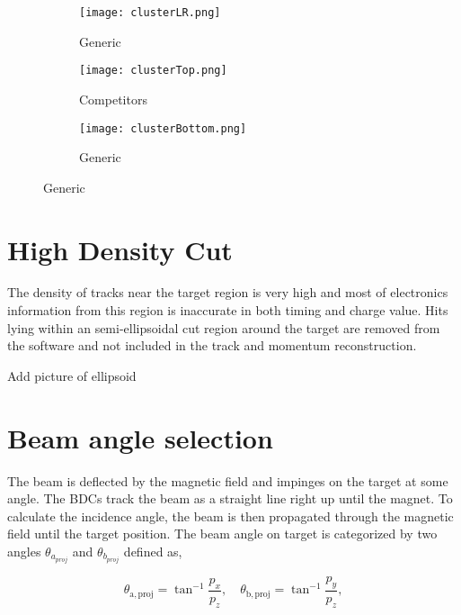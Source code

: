 \begin{figure}[!htb]
    \centering
    \begin{subfigure}[t]{0.45\textwidth}
        \centering
        \texttt{[image: clusterLR.png]} 
        \caption{Generic} \label{fig:clusterLR}
    \end{subfigure}
    \hfill
    \begin{subfigure}[t]{0.45\textwidth}
        \centering
        \texttt{[image: clusterTop.png]} 
        \caption{Competitors} \label{fig:clusterTop}
    \end{subfigure}
    
    \begin{subfigure}[t]{0.45\textwidth}
        \centering
        \texttt{[image: clusterBottom.png]} 
        \caption{Generic} \label{fig:clusterBottom}
    \end{subfigure}
   
\label{fig:edge}
\end{figure}

\section{High Density Cut}
The density of tracks near the target region is very high and most of electronics information from this region is inaccurate in both timing and charge value. Hits lying within an semi-ellipsoidal cut region around the target are removed from the software and not included in the track and momentum reconstruction. 

Add picture of ellipsoid 

\section{Beam angle selection}
The beam is deflected by the magnetic field and impinges on the target at some angle. The BDCs track the beam as a straight line right up until the magnet.  To calculate the incidence angle, the beam is then propagated through the magnetic field until the target position. The beam angle on target is categorized by two angles $\theta_{a_{proj}}$ and $\theta_{b_{proj}}$ defined as, 


\begin{equation}
  \theta_\mathrm{a,proj}=\tan^{-1}\frac{p_x}{p_z},\quad
  \theta_\mathrm{b,proj}=\tan^{-1}\frac{p_y}{p_z},
  \label{beamAngle}
\end{equation}

